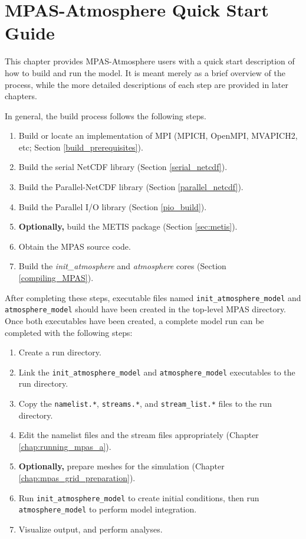 \chapter{MPAS-Atmosphere Quick Start Guide}
\label{chap:quick_start}

This chapter provides MPAS-Atmosphere users with a quick start description of
how to build and run the model. It is meant merely as a brief overview of the
process, while the more detailed descriptions of each step are provided in later
chapters.

In general, the build process follows the following steps.

\begin{enumerate}
	\item Build or locate an implementation of MPI (MPICH, OpenMPI, MVAPICH2, etc; Section \ref{build_prerequisites}).
	\item Build the serial NetCDF library (Section \ref{serial_netcdf}).
	\item Build the Parallel-NetCDF library (Section \ref{parallel_netcdf}).
	\item Build the Parallel I/O library (Section \ref{pio_build}).
	\item {\bf Optionally,} build the METIS package (Section \ref{sec:metis}).
	\item Obtain the MPAS source code.
	\item Build the {\em init\_atmosphere} and {\em atmosphere} cores (Section \ref{compiling_MPAS}).
\end{enumerate}

After completing these steps, executable files named {\tt init\_atmosphere\_model} and
{\tt atmosphere\_model} should have been created in the top-level MPAS directory. Once
both executables have been created, a complete model run can be completed with the following steps:

\begin{enumerate}
	\item Create a run directory.
	\item Link the {\tt init\_atmosphere\_model} and {\tt atmosphere\_model} executables to the run directory.
	\item Copy the {\tt namelist.*}, {\tt streams.*}, and {\tt stream\_list.*} files to the run directory. 
	\item Edit the namelist files and the stream files appropriately (Chapter \ref{chap:running_mpas_a}).
	\item {\bf Optionally,} prepare meshes for the simulation (Chapter \ref{chap:mpas_grid_preparation}).
	\item Run {\tt init\_atmosphere\_model} to create initial conditions, then run {\tt atmosphere\_model} to perform model integration.
	\item Visualize output, and perform analyses.
\end{enumerate}
